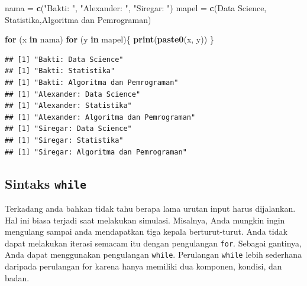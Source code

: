 \documentclass[
]{book}
\newenvironment{Shaded}{\begin{snugshade}}{\end{snugshade}}
\newcommand{\ControlFlowTok}[1]{\textcolor[rgb]{0.13,0.29,0.53}{\textbf{#1}}}
\newcommand{\FunctionTok}[1]{\textcolor[rgb]{0.13,0.29,0.53}{\textbf{#1}}}
\newcommand{\NormalTok}[1]{#1}
\newcommand{\OtherTok}[1]{\textcolor[rgb]{0.56,0.35,0.01}{#1}}
\newcommand{\StringTok}[1]{\textcolor[rgb]{0.31,0.60,0.02}{#1}}
\begin{document}
\begin{Shaded}
\begin{Highlighting}[]
\NormalTok{nama }\OtherTok{=} \FunctionTok{c}\NormalTok{(}\StringTok{"Bakti: "}\NormalTok{, }\StringTok{"Alexander: "}\NormalTok{, }\StringTok{"Siregar: "}\NormalTok{)}
\NormalTok{mapel }\OtherTok{=} \FunctionTok{c}\NormalTok{(}\StringTok{\textquotesingle{}Data Science\textquotesingle{}}\NormalTok{, }\StringTok{\textquotesingle{}Statistika\textquotesingle{}}\NormalTok{,}\StringTok{\textquotesingle{}Algoritma dan Pemrograman\textquotesingle{}}\NormalTok{)}

\ControlFlowTok{for}\NormalTok{ (x }\ControlFlowTok{in}\NormalTok{ nama)}
  \ControlFlowTok{for}\NormalTok{ (y }\ControlFlowTok{in}\NormalTok{ mapel)\{}
    \FunctionTok{print}\NormalTok{(}\FunctionTok{paste0}\NormalTok{(x, y))}
\NormalTok{  \}}
\end{Highlighting}
\end{Shaded}

\begin{verbatim}
## [1] "Bakti: Data Science"
## [1] "Bakti: Statistika"
## [1] "Bakti: Algoritma dan Pemrograman"
## [1] "Alexander: Data Science"
## [1] "Alexander: Statistika"
## [1] "Alexander: Algoritma dan Pemrograman"
## [1] "Siregar: Data Science"
## [1] "Siregar: Statistika"
## [1] "Siregar: Algoritma dan Pemrograman"
\end{verbatim}

\hypertarget{sintaks-while}{%
\subsection{\texorpdfstring{Sintaks \texttt{while}}{Sintaks while}}\label{sintaks-while}}

Terkadang anda bahkan tidak tahu berapa lama urutan input harus dijalankan. Hal ini biasa terjadi saat melakukan simulasi. Misalnya, Anda mungkin ingin mengulang sampai anda mendapatkan tiga kepala berturut-turut. Anda tidak dapat melakukan iterasi semacam itu dengan pengulangan \texttt{for}. Sebagai gantinya, Anda dapat menggunakan pengulangan \texttt{while}. Perulangan \texttt{while} lebih sederhana daripada perulangan for karena hanya memiliki dua komponen, kondisi, dan badan.
\end{document}
